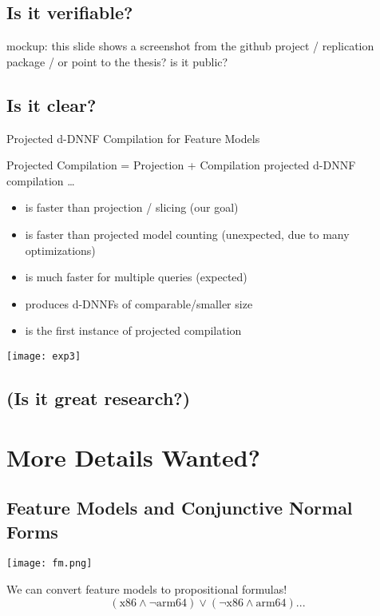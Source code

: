 \documentclass[
	aspectratio=169, %
	8pt, %
]{beamer}
\begin{document}
\subsection{Is it verifiable?}
\begin{frame}{\insertsubsection}
	mockup: this slide shows a screenshot from the github project / replication package / or point to the thesis? is it public?
\end{frame}

\subsection{Is it clear?}
\begin{frame}{\insertsubsection\hfill{}Projected d-DNNF Compilation for Feature Models}
	\begin{fancycolumns}[widths={52}]
		\begin{note}{Projected Compilation = Projection + Compilation}
			projected d-DNNF compilation \ldots
			\begin{itemize}
				\item is faster than projection / slicing (our  goal)
				\item is faster than projected model counting (unexpected, due to many optimizations)
				\item is much faster for multiple queries (expected)
				\item produces d-DNNFs of comparable/smaller size
				\item is the first instance of projected compilation
			\end{itemize}
		\end{note}
		\nextcolumn
		\texttt{[image: exp3]}		
	\end{fancycolumns}
\end{frame}

\subsection{(Is it great research?)}

\section{More Details Wanted?}

\subsection{Feature Models and Conjunctive Normal Forms}
\begin{frame}{\insertsubsection}
	\centering
	\texttt{[image: fm.png]}
	\begin{block}{}
		We can convert feature models to propositional formulas!
		\begin{equation*}
			(\text{x86} \land \neg \text{arm64}) \lor (\neg \text{x86} \land \text{arm64}) ...
		\end{equation*}
	\end{block}
\end{frame}
\end{document}
